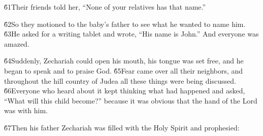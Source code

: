 \v{61}Their friends told her, ``None of your relatives has that name.''

\v{62}So they motioned to the baby's father to see what he wanted to name him. \v{63}He asked for a writing tablet and wrote, ``His name is John.'' And everyone was amazed.

\v{64}Suddenly, Zechariah could open his mouth, his tongue was set free, and he began to speak and to praise God. \v{65}Fear came over all their neighbors, and throughout the hill country of Judea all these things were being discussed. \v{66}Everyone who heard about it kept thinking what had happened and asked, ``What will this child become?'' because it was obvious that the hand of the Lord was with him.

\v{67}Then his father Zechariah was filled with the Holy Spirit and prophesied:

